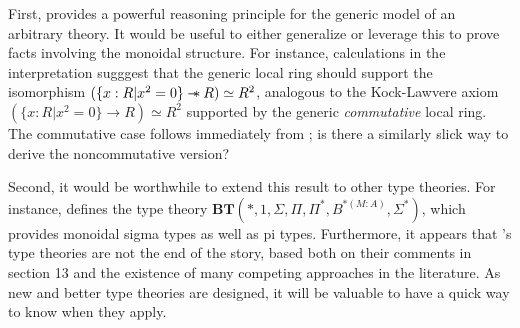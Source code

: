 \documentclass{article}
\newcommand*{\wand}{\mathbin{-\mkern-6mu*}}
\begin{document}
First, \cite{blechschmidt} provides a powerful reasoning principle for the generic model of an arbitrary theory.
It would be useful to either generalize or leverage this to prove facts involving the monoidal structure.
For instance, calculations in the interpretation sugggest that the generic local ring should support
the isomorphism \((\{x : R | x^2 = 0\} \wand R) \simeq R^2\),
analogous to the Kock-Lawvere axiom \((\{x : R | x^2 = 0\} \to R) \simeq R^2\)
supported by the generic \emph{commutative} local ring.
The commutative case follows immediately from \cite[Theorem 4.10]{blechschmidt};
is there a similarly slick way to derive the noncommutative version?

Second, it would be worthwhile to extend this result to other type theories.
For instance, \cite{schopp} defines the type theory
\(\mathbf{BT}(*, 1, \Sigma, \Pi, \Pi^*, B^{*(M:A)}, \Sigma^*)\),
which provides monoidal sigma types as well as pi types.
Furthermore, it appears that \cite{schopp}'s type theories are not the end of the story,
based both on their comments in section 13 and the existence of many competing approaches in the literature.
As new and better type theories are designed, it will be valuable to have a quick way to know when they apply.

\printbibliography
\end{document}

